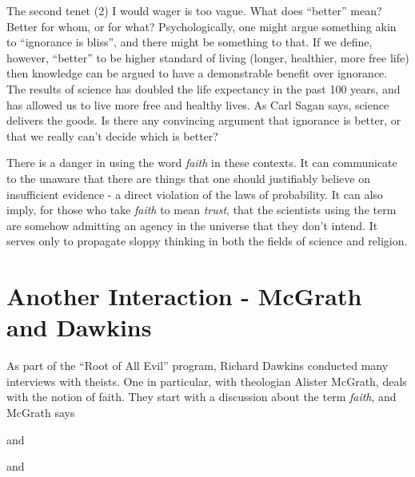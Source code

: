 \documentclass{tufte-book}
\begin{document}
The second tenet (2) I would wager is too vague. What does ``better''
mean? Better for whom, or for what? Psychologically, one might argue
something akin to ``ignorance is bliss'', and there might be something
to that. If we define, however, ``better'' to be higher standard of
living (longer, healthier, more free life) then knowledge can be argued
to have a demonstrable benefit over ignorance. The results of science
has doubled the life expectancy in the past 100 years, and has allowed
us to live more free and healthy lives. As Carl Sagan says, science
delivers the goods. Is there any convincing argument that ignorance is
better, or that we really can't decide which is better?

There is a danger in using the word \emph{faith} in these contexts. It
can communicate to the unaware that there are things that one should
justifiably believe on insufficient evidence - a direct violation of the
laws of probability. It can also imply, for those who take \emph{faith}
to mean \emph{trust}, that the scientists using the term are somehow
admitting an agency in the universe that they don't intend. It serves
only to propagate sloppy thinking in both the fields of science and
religion.

\section{Another Interaction - McGrath and
Dawkins}\label{another-interaction---mcgrath-and-dawkins}

As part of the ``Root of All Evil'' program, Richard Dawkins conducted
many interviews with theists. One in particular, with theologian Alister
McGrath, deals with the notion of faith\citep{Dawkins:aa}. They start
with a discussion about the term \emph{faith}, and McGrath says


and


and

\end{document}
